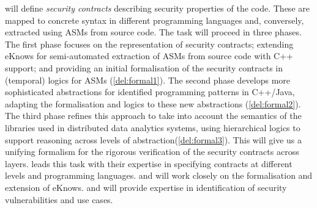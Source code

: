 \begin{Workpackage}{\thewpno}
\begin{Task}
\theTask{} will define \emph{security contracts} describing security properties of the code. These are mapped to concrete syntax in different
programming languages and, conversely, extracted using ASMs from source code. The task will proceed in three phases.
The first phase focuses on the representation of security contracts;  extending \textsf{eKnows} for semi-automated extraction of ASMs from source code with C++ support; and providing an initial formalisation of the security contracts in (temporal) logics for ASMs (\ref{del:formal1}). The second phase develops more sophisticated abstractions for identified programming patterns in C++/Java, adapting the formalisation and logics to these new abstractions (\ref{del:formal2}). The third phase refines this approach to take into account the semantics of the libraries used in distributed data analytics systems, using hierarchical logics to support reasoning across levels of abstraction(\ref{del:formal3}). This will give us a unifying formalism for the rigorous verification of the security contracts across layers.
\UCM leads this task with their expertise in specifying contracts at different levels and programming languages. \SA and \SCCHshort will work closely on the formalisation and extension of \textsf{eKnows}. \IBMshort and \SOPRAshort will provide expertise in identification of security vulnerabilities and use cases.
\end{Task}

\begin{Task}
\TaskResults{%
\ref{del:formal1},
\ref{del:formal2},
\ref{del:formal3}
}
\TaskHeader{}


\end{Task}
\end{Workpackage}
